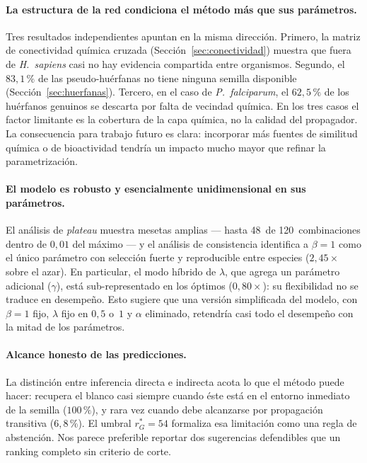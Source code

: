\documentclass[11pt,a4paper]{article}
\newcommand{\rGe}{r_{G}^{\ast}}
\newcommand{\spn}[1]{\textit{#1}}
\begin{document}
\paragraph{La estructura de la red condiciona el método más que sus parámetros.}
Tres resultados independientes apuntan en la misma dirección. Primero, la matriz
de conectividad química cruzada (Sección~\ref{sec:conectividad}) muestra que
fuera de \spn{H.~sapiens} casi no hay evidencia compartida entre organismos.
Segundo, el $83{,}1\,\%$ de las pseudo-huérfanas no tiene ninguna semilla
disponible (Sección~\ref{sec:huerfanas}). Tercero, en el caso de
\spn{P.~falciparum}, el $62{,}5\,\%$ de los huérfanos genuinos se descarta por
falta de vecindad química. En los tres casos el factor limitante es la cobertura
de la capa química, no la calidad del propagador. La consecuencia para trabajo
futuro es clara: incorporar más fuentes de similitud química o de bioactividad
tendría un impacto mucho mayor que refinar la parametrización.

\paragraph{El modelo es robusto y esencialmente unidimensional en sus
parámetros.} El análisis de \emph{plateau} muestra mesetas amplias --- hasta
48~de 120~combinaciones dentro de $0{,}01$ del máximo --- y el análisis de
consistencia identifica a $\beta = 1$ como el único parámetro con selección
fuerte y reproducible entre especies ($2{,}45\times$ sobre el azar). En
particular, el modo híbrido de $\lambda$, que agrega un parámetro adicional
($\gamma$), está sub-representado en los óptimos ($0{,}80\times$): su
flexibilidad no se traduce en desempeño. Esto sugiere que una versión
simplificada del modelo, con $\beta = 1$ fijo, $\lambda$ fijo en $0{,}5$ o~$1$ y
$\alpha$ eliminado, retendría casi todo el desempeño con la mitad de los
parámetros.

\paragraph{Alcance honesto de las predicciones.} La distinción entre inferencia
directa e indirecta acota lo que el método puede hacer: recupera el blanco casi
siempre cuando éste está en el entorno inmediato de la semilla ($100\,\%$), y
rara vez cuando debe alcanzarse por propagación transitiva ($6{,}8\,\%$). El
umbral $\rGe = 54$ formaliza esa limitación como una regla de abstención. Nos
parece preferible reportar dos sugerencias defendibles que un ranking completo
sin criterio de corte.
\end{document}
